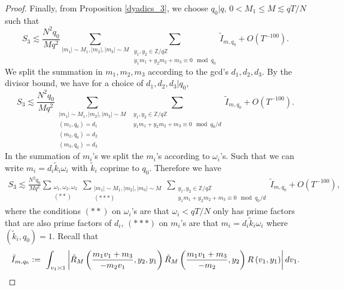 \begin{proof}
    Finally, from Proposition \ref{dyadics_3}, we choose $q_0|q$, $0<M_1\leq M\lesssim qT/N$ such that
    \[
        S_3\lesssim \frac{N^2q_0}{Mq^2}\sum_{|m_1|\sim M_1,|m_2|,|m_3|\sim M}\sum_{\substack{y_1,y_2 \in\mathbb{Z}/q\mathbb{Z} \\ y_1m_1+y_2m_2+m_3\equiv 0 \mod q_0}}\tilde{I}_{m,q_0}+O(T^{-100}).
    \]
    We split the summation in $m_1,m_2,m_3$ according to the gcd's $d_1,d_2,d_3$. By the divisor bound, we have for a choice of $d_1,d_2,d_3|q_0$,
     \[
        S_3\lesssim \frac{N^2q_0}{Mq^2}\sum_{\substack{|m_1|\sim M_1,|m_2|,|m_3|\sim M\\
        (m_1,q_0)=d_1\\(m_2,q_0)=d_2\\(m_3,q_0)=d_3}}\sum_{\substack{y_1,y_2 \in\mathbb{Z}/q\mathbb{Z} \\ y_1m_1+y_2m_2+m_3\equiv 0 \mod q_0/d}}\tilde{I}_{m,q_0}+O(T^{-100}).
    \]
    In the summation of $m_i$'s we split the $m_i$'s according to $\omega_i$'s. Such that we can write $m_i=d_i\tilde{k}_i\omega_i$ with $\tilde{k}_i$ coprime to $q_0$.
    Therefore we have \begin{align*}
        S_3\lesssim \frac{N^2q_0}{Mq^2} \sum_{\substack{\omega_1,\omega_2,\omega_3\\ (**)}}  \sum_{\substack{|m_1|\sim M_1,|m_2|,|m_3|\sim M\\
        (***)}}\sum_{\substack{y_1,y_2 \in\mathbb{Z}/q\mathbb{Z} \\ y_1m_1+y_2m_2+m_3\equiv 0 \mod q_0/d}}\tilde{I}_{m,q_0}+O(T^{-100}),
    \end{align*}
    where the conditions $(**)$ on $\omega_i$'s are that $\omega_i<qT/N$ only has prime factors that are also prime factors of $d_i$, $(***)$ on $m_i$'s are that
    $m_i=d_i\tilde{k}_i\omega_i$ where $(\tilde{k}_i,q_0)=1$. 
    Recall that \[
        \tilde{I}_{m,q_0}\defeq \ \int_{v_1\asymp 1} \left| \tilde{R}_M\left(\frac{m_1v_1+m_3}{-m_2v_1},y_2,y_1\right)
    \tilde{R}_M\left(\frac{m_1v_1+m_3}{-m_2},y_2\right)R\left(v_1,y_1\right)\right| dv_1.\]


\end{proof}
